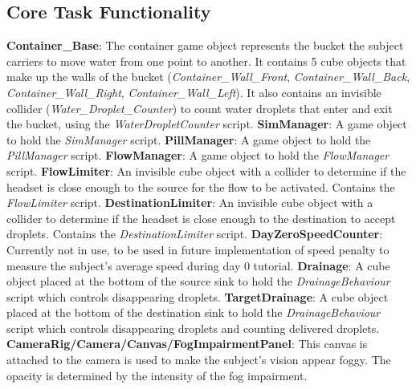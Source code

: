 \documentclass{article}
\begin{document}
\subsection{Core Task Functionality} %
\textbf{Container\_Base}: The container game object represents the bucket the subject carriers to move water from one point to another. It contains 5 cube objects that make up the walls of the bucket (\textit{Container\_Wall\_Front}, \textit{Container\_Wall\_Back}, \textit{Container\_Wall\_Right}, \textit{Container\_Wall\_Left}). It also contains an invisible collider (\textit{Water\_Droplet\_Counter}) to count water droplets that enter and exit the bucket, using the \textit{WaterDropletCounter} script.\newline \newline
\textbf{SimManager}: A game object to hold the \textit{SimManager} script.\newline \newline
\textbf{PillManager}: A game object to hold the \textit{PillManager} script.\newline \newline
\textbf{FlowManager}: A game object to hold the \textit{FlowManager} script.\newline \newline
\textbf{FlowLimiter}: An invisible cube object with a collider to determine if the headset is close enough to the source for the flow to be activated. Contains the \textit{FlowLimiter} script.\newline \newline
\textbf{DestinationLimiter}: An invisible cube object with a collider to determine if the headset is close enough to the destination to accept droplets. Contains the \textit{DestinationLimiter} script.\newline \newline
\textbf{DayZeroSpeedCounter}: Currently not in use, to be used in future implementation of speed penalty to measure the subject's average speed during day 0 tutorial.\newline \newline
\textbf{Drainage}: A cube object placed at the bottom of the source sink to hold the \textit{DrainageBehaviour} script which controls disappearing droplets.
\textbf{TargetDrainage}: A cube object placed at the bottom of the destination sink to hold the \textit{DrainageBehaviour} script which controls disappearing droplets and counting delivered droplets.\newline \newline
\textbf{CameraRig/Camera/Canvas/FogImpairmentPanel}: This canvas is attached to the camera is used to make the subject's vision appear foggy. The opacity is determined by the intensity of the fog impairment.\newline \newline
\end{document}
